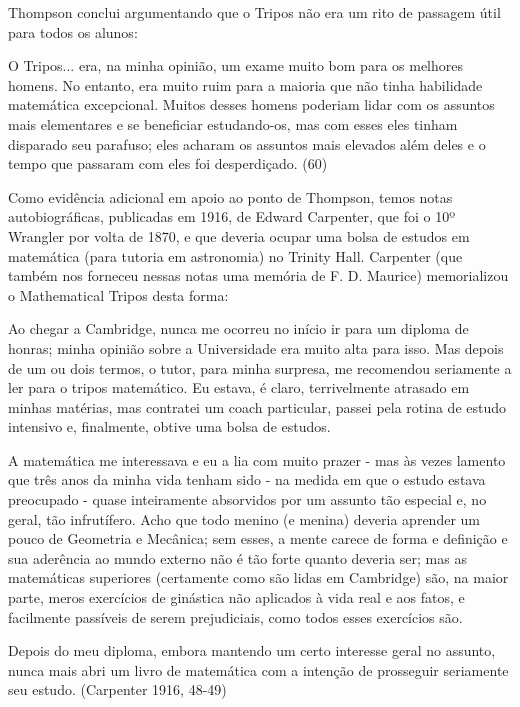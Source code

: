 \documentclass[a4paper,12pt]{article}[abntex2]
\begin{document}
Thompson conclui argumentando que o Tripos não era um rito de passagem útil para todos os alunos:

O Tripos... era, na minha opinião, um exame muito bom para os melhores homens. No entanto, era muito ruim para a maioria que não tinha habilidade matemática excepcional. Muitos desses homens poderiam lidar com os assuntos mais elementares e se beneficiar estudando-os, mas com esses eles tinham disparado seu parafuso; eles acharam os assuntos mais elevados além deles e o tempo que passaram com eles foi desperdiçado. (60)

Como evidência adicional em apoio ao ponto de Thompson, temos notas autobiográficas, publicadas em 1916, de Edward Carpenter, que foi o 10º Wrangler por volta de 1870, e que deveria ocupar uma bolsa de estudos em matemática (para tutoria em astronomia) no Trinity Hall. Carpenter (que também nos forneceu nessas notas uma memória de F. D. Maurice) memorializou o Mathematical Tripos desta forma:

Ao chegar a Cambridge, nunca me ocorreu no início ir para um diploma de honras; minha opinião sobre a Universidade era muito alta para isso. Mas depois de um ou dois termos, o tutor, para minha surpresa, me recomendou seriamente a ler para o tripos matemático. Eu estava, é claro, terrivelmente atrasado em minhas matérias, mas contratei um coach particular, passei pela rotina de estudo intensivo e, finalmente, obtive uma bolsa de estudos.

A matemática me interessava e eu a lia com muito prazer - mas às vezes lamento que três anos da minha vida tenham sido - na medida em que o estudo estava preocupado - quase inteiramente absorvidos por um assunto tão especial e, no geral, tão infrutífero. Acho que todo menino (e menina) deveria aprender um pouco de Geometria e Mecânica; sem esses, a mente carece de forma e definição e sua aderência ao mundo externo não é tão forte quanto deveria ser; mas as matemáticas superiores (certamente como são lidas em Cambridge) são, na maior parte, meros exercícios de ginástica não aplicados à vida real e aos fatos, e facilmente passíveis de serem prejudiciais, como todos esses exercícios são.

Depois do meu diploma, embora mantendo um certo interesse geral no assunto, nunca mais abri um livro de matemática com a intenção de prosseguir seriamente seu estudo. (Carpenter 1916, 48-49)
\end{document}
